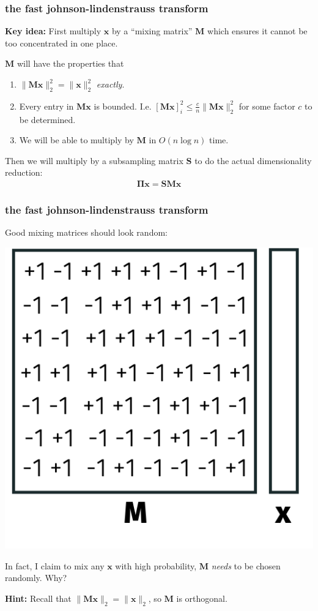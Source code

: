 \documentclass[compress]{beamer}
\newcommand{\bs}[1]{\boldsymbol{#1}}
\newcommand{\bv}[1]{\mathbf{#1}}
\begin{document}
\begin{frame}[t]
	\frametitle{the fast johnson-lindenstrauss transform}

\textbf{Key idea:} First multiply $\bv{x}$ by a ``mixing matrix'' $\bv{M}$ which ensures it cannot be too concentrated in one place. 

$\bv{M}$ will have the properties that 
\begin{enumerate}
	\item $\|\bv{M}\bv{x}\|_2^2 = \|\bv{x}\|_2^2$ \emph{exactly}.
	\item Every entry in $\bv{M}\bv{x}$ is bounded. I.e. $[\bv{M}\bv{x}]_i^2 \leq \frac{c}{n}\|\bv{M}\bv{x}\|_2^2$ for some factor $c$ to be determined.
	\item We will be able to multiply by $\bv{M}$ in $O(n \log n)$ time.
\end{enumerate}
 Then we will multiply by a subsampling matrix $\bv{S}$ to do the actual dimensionality reduction:
\begin{align*}
	\bs{\Pi}\bv{x} = \bv{SM}\bv{x}
\end{align*}
\end{frame}



\begin{frame}[t]
	\frametitle{the fast johnson-lindenstrauss transform}
	Good mixing matrices should look random:
	\begin{center}
	\includegraphics[width=.4\textwidth]{mixing.png}
	
	In fact, I claim to mix any $\bv{x}$ with high probability, $\bv{M}$ \emph{needs} to be chosen randomly. Why?
	
	\textbf{Hint:} Recall that $\|\bv{M}\bv{x}\|_2 = \|\bv{x}\|_2$, so $\bv{M}$ is orthogonal. 
	\end{center}
	
\end{frame}
\end{document}
